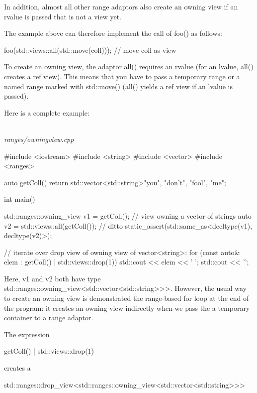 In addition, almost all other range adaptors also create an owning view if an rvalue is passed that is not a view yet.

The example above can therefore implement the call of foo() as follows:

\begin{cpp}
foo(std::views::all(std::move(coll))); // move coll as view
\end{cpp}

To create an owning view, the adaptor all() requires an rvalue (for an lvalue, all() creates a ref view). This means that you have to pass a temporary range or a named range marked with std::move() (all() yields a ref view if an lvalue is passed).

Here is a complete example:

\noindent
\hspace*{\fill} \\ %
\textit{ranges/owningview.cpp}

\begin{cpp}
#include <iostream>
#include <string>
#include <vector>
#include <ranges>

auto getColl()
{
	return std::vector<std::string>{"you", "don't", "fool", "me"};
}

int main()
{
	std::ranges::owning_view v1 = getColl(); // view owning a vector of strings
	auto v2 = std::views::all(getColl()); // ditto
	static_assert(std::same_as<decltype(v1), decltype(v2)>);
	
	// iterate over drop view of owning view of vector<string>:
	for (const auto& elem : getColl() | std::views::drop(1)) {
		std::cout << elem << ' ';
	}
	std::cout << '\n';
}
\end{cpp}

Here, v1 and v2 both have type std::ranges::owning\_view<std::vector<std::string>>>. However, the usual way to create an owning view is demonstrated the range-based for loop at the end of the program: it creates an owning view indirectly when we pass the a temporary container to a range adaptor.

The expression

\begin{cpp}
getColl() | std::views::drop(1)
\end{cpp}

creates a

\begin{cpp}
std::ranges::drop_view<std::ranges::owning_view<std::vector<std::string>>>
\end{cpp}

